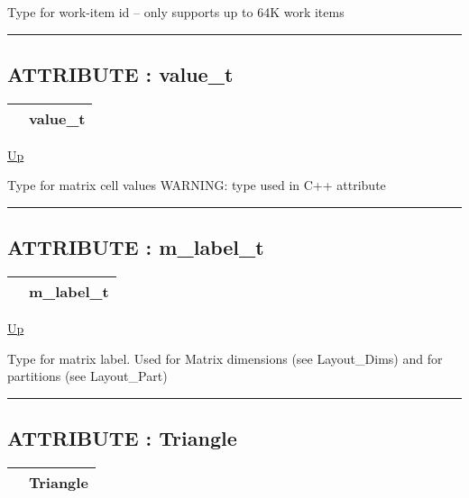 \par
Type for work-item id -- only supports up to 64K work items


\rule{\textwidth}{0.4pt}
\subsection*{ATTRIBUTE : value\_t}
\hypertarget{ecldoc:pbblas.types.value_t}{}

{\renewcommand{\arraystretch}{1.5}
\begin{tabularx}{\textwidth}{|>{\raggedright\arraybackslash}l|X|}
\hline
\hspace{0pt} & value\_t \\
\hline
\end{tabularx}
}

\hyperlink{ecldoc:PBblas.Types}{Up}

\par
Type for matrix cell values WARNING: type used in C++ attribute


\rule{\textwidth}{0.4pt}
\subsection*{ATTRIBUTE : m\_label\_t}
\hypertarget{ecldoc:pbblas.types.m_label_t}{}

{\renewcommand{\arraystretch}{1.5}
\begin{tabularx}{\textwidth}{|>{\raggedright\arraybackslash}l|X|}
\hline
\hspace{0pt} & m\_label\_t \\
\hline
\end{tabularx}
}

\hyperlink{ecldoc:PBblas.Types}{Up}

\par
Type for matrix label. Used for Matrix dimensions (see Layout\_Dims) and for partitions (see Layout\_Part)


\rule{\textwidth}{0.4pt}
\subsection*{ATTRIBUTE : Triangle}
\hypertarget{ecldoc:ecldoc-Triangle}{}

{\renewcommand{\arraystretch}{1.5}
\begin{tabularx}{\textwidth}{|>{\raggedright\arraybackslash}l|X|}
\hline
\hspace{0pt} & Triangle \\
\hline
\end{tabularx}
}

